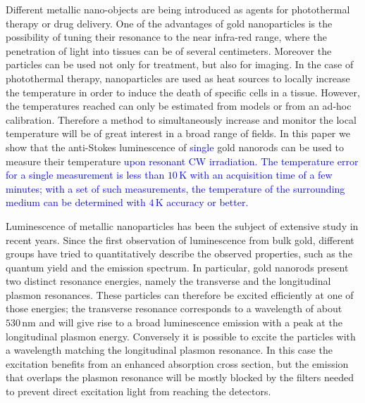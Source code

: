 \documentclass[journal=nalefd,manuscript=letter]{achemso}
\newcommand{\HI}[1]{\textcolor{blue}{#1}} %
\newcommand{\K}{\ensuremath{\,\textrm{K}}}
\newcommand{\nm}{\ensuremath{\,\textrm{nm}}}
\begin{document}
Different metallic nano-objects are being introduced as agents for photothermal
therapy\cite{Huang2006,Huang2008} or drug delivery\cite{Kang2013}. One of the
advantages of gold nanoparticles is the possibility of tuning their resonance to
the near infra-red range, where the penetration of light into tissues can be of
several
centimeters\cite{Huang2006,Gobin2007,Hirsch2003,ONeal2004,Li2013c,Huang2008}.
Moreover the particles can be used not only for treatment, but also for
imaging\cite{Zhao2014a,Huang2006}. In the case of photothermal therapy,
nanoparticles are used as heat sources\cite{Gobin2007,Hirsch2003} to locally
increase the temperature in order to induce the death of specific cells in a
tissue\cite{Huang2008,Huang2006}. However, the temperatures
reached\cite{Donner2013} can only be estimated from models\cite{Zhao2014a} or
from an ad-hoc calibration. Therefore a method to simultaneously increase 
and monitor the local temperature will be of great interest in a
broad range of fields. In this paper we show that the anti-Stokes luminescence
of \HI{single} gold nanorods can be used to measure their temperature 
\HI{upon resonant CW irradiation. The temperature error for a single measurement
is less than $10\K$ with an acquisition time of a few minutes; with a set of such 
measurements, the temperature of the surrounding medium can be determined with 
$4\K$ accuracy or better.}

Luminescence of metallic nanoparticles has been the subject of extensive study in
recent years. Since the first observation of luminescence from bulk
gold\cite{Mooradian1969}, different groups have tried to quantitatively describe
the observed properties\HI{\cite{Mohamed2000,Beversluis2003a,Huang2014, hugall2015demonstrating,mertens2017light}}, 
such as the quantum yield\cite{Fang2012,Rao2015,Yorulmaz2012,Cheng2015,Dulkeith2004} and the
emission spectrum\cite{Link2010}. In particular, gold nanorods present two distinct
resonance energies, namely the transverse and the longitudinal plasmon
resonances. These particles can therefore be excited efficiently at one of those
energies; the transverse resonance corresponds to a wavelength of about $530\nm$ and will give
rise to a broad luminescence emission with a peak at the longitudinal plasmon energy.
Conversely it is possible to excite the particles with a wavelength matching
the longitudinal plasmon resonance. In this case the excitation benefits from
an enhanced absorption cross section, but the emission that overlaps the plasmon
resonance will be mostly blocked by the filters needed to prevent direct
excitation light from reaching the detectors.
\end{document}
